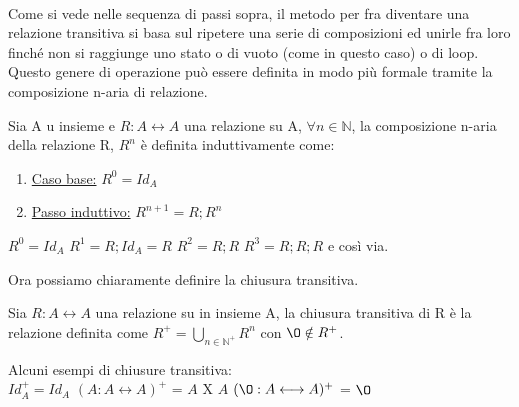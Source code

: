 \\
Come si vede nelle sequenza di passi sopra, il metodo per fra diventare una relazione transitiva si basa sul ripetere una serie di composizioni ed unirle fra loro finché non si raggiunge uno stato o di vuoto (come in questo caso) o di loop. Questo genere di operazione può essere definita in modo più formale tramite la composizione n-aria di relazione.
\begin{definition}
    Sia A u insieme e $R: A \longleftrightarrow A$ una relazione su A, $\forall n \in \mathbb{N}$, la composizione n-aria della relazione R, $R^n$ è definita induttivamente come:
    \begin{enumerate}
        \item \underline{Caso base:} $R^0 = Id_A$
        \item \underline{Passo induttivo:} $R^{n+1} = R;R^n$
    \end{enumerate}
\end{definition}
\begin{example}
$R^0 = Id_A$ \hspace{.3cm} $R^1 = R;Id_A = R$ \hspace{.3cm} $R^2 = R;R$ \hspace{.3cm} $R^3 = R;R;R$ e così via.
\end{example}
Ora possiamo chiaramente definire la chiusura transitiva.
\begin{definition}
    Sia $R: A \longleftrightarrow A$ una relazione su in insieme A, la chiusura transitiva di R è la relazione definita come $R^{+} = \bigcup\limits_{n \in \mathbb{N}^+} R^{n}$ con $\O \notin R^{+}$.
\end{definition}
\begin{example}
Alcuni esempi di chiusure transitiva:\\
$Id_A^+ = Id_A$ \hspace{.7cm} $(A: A \longleftrightarrow A)^+$ = $A$ X $A$ \hspace{.7cm} $(\O: A \longleftrightarrow A)^+$ = $\O$
\end{example}

